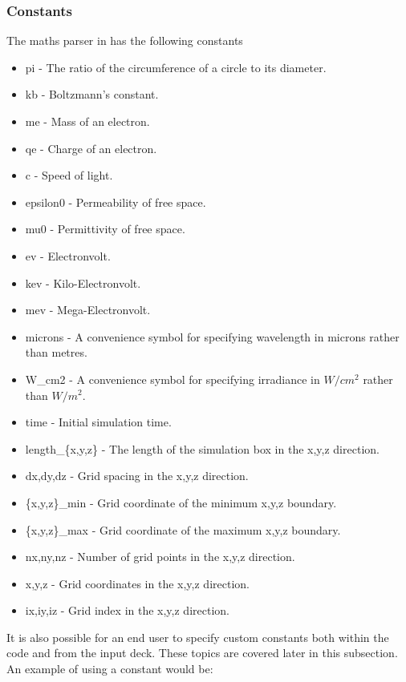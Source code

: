 \subsubsection{Constants}
\label{sec:constants}
The maths parser in {\EPOCH}  has the following constants
\begin{itemize}
\item pi - The ratio of the circumference of a circle to its diameter.
\item kb - Boltzmann's constant.
\item me - Mass of an electron.
\item qe - Charge of an electron.
\item c - Speed of light.
\item epsilon0 - Permeability of free space.
\item mu0 - Permittivity of free space.
\item ev - Electronvolt.
\item kev - Kilo-Electronvolt.
\item mev - Mega-Electronvolt.
\item microns - A convenience symbol for specifying wavelength in microns
rather than metres.
\item W\_cm2 - A convenience symbol for specifying irradiance in $W/cm^2$
rather than $W/m^2$.
\item time - Initial simulation time.
\item length\_\{x,y,z\} - The length of the simulation box in the x,y,z
  direction.
\item dx,dy,dz - Grid spacing in the x,y,z direction.
\item \{x,y,z\}\_min - Grid coordinate of the minimum x,y,z boundary.
\item \{x,y,z\}\_max - Grid coordinate of the maximum x,y,z boundary.
\item nx,ny,nz - Number of grid points in the x,y,z direction.
\item x,y,z - Grid coordinates in the x,y,z direction.
\item ix,iy,iz - Grid index in the x,y,z direction.
\end{itemize}

It is also possible for an end user to specify custom constants both within
the code and from the input deck. These topics are covered later in this
subsection. An example of using a constant would be:\\
\indent{}\\

